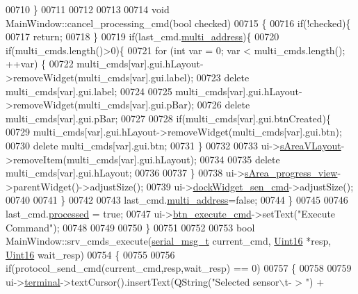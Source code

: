 \begin{DoxyCode}
00710 \}
00711 
00712 
00713 
00714 \textcolor{keywordtype}{void} MainWindow::cancel\_processing\_cmd(\textcolor{keywordtype}{bool} checked)
00715 \{
00716     \textcolor{keywordflow}{if}(!checked)\{
00717         \textcolor{keywordflow}{return};
00718     \}
00719     \textcolor{keywordflow}{if}(last\_cmd.\hyperlink{a00001_a8e69b971c61ced27a7567efd2bf0db59}{multi\_address})\{
00720     \textcolor{keywordflow}{if}(multi\_cmds.length()>0)\{
00721         \textcolor{keywordflow}{for} (\textcolor{keywordtype}{int} var = 0; var < multi\_cmds.length(); ++var) \{
00722             multi\_cmds[var].gui.hLayout->removeWidget(multi\_cmds[var].gui.label);
00723             \textcolor{keyword}{delete} multi\_cmds[var].gui.label;
00724 
00725             multi\_cmds[var].gui.hLayout->removeWidget(multi\_cmds[var].gui.pBar);
00726             \textcolor{keyword}{delete} multi\_cmds[var].gui.pBar;
00727 
00728             \textcolor{keywordflow}{if}(multi\_cmds[var].gui.btnCreated)\{
00729             multi\_cmds[var].gui.hLayout->removeWidget(multi\_cmds[var].gui.btn);
00730             \textcolor{keyword}{delete} multi\_cmds[var].gui.btn;
00731             \}
00732 
00733             ui->\hyperlink{a00027_a2bdce9ad313cd4ee575613f36cbc4678}{sAreaVLayout}->removeItem(multi\_cmds[var].gui.hLayout);
00734 
00735             \textcolor{keyword}{delete} multi\_cmds[var].gui.hLayout;
00736 
00737         \}
00738     ui->\hyperlink{a00027_ae4fe44aa026dd0e84e0f10cdcabca504}{sArea\_progress\_view}->parentWidget()->adjustSize();
00739     ui->\hyperlink{a00027_a9eb86a5ee396766f0f4a65f2d2bd7688}{dockWidget\_sen\_cmd}->adjustSize();
00740 
00741     \}
00742 
00743     last\_cmd.\hyperlink{a00001_a8e69b971c61ced27a7567efd2bf0db59}{multi\_address}=\textcolor{keyword}{false};
00744    \}
00745 
00746     last\_cmd.\hyperlink{a00001_a3e88f779da9798a5da7dda227e2ca388}{processed} = \textcolor{keyword}{true};
00747     ui->\hyperlink{a00027_a9ea50d44e38316e4203933698cbc14a6}{btn\_execute\_cmd}->setText(\textcolor{stringliteral}{"Execute Command"});
00748 
00749 
00750 \}
00751 
00752 
00753 \textcolor{keywordtype}{bool} MainWindow::srv\_cmds\_execute(\hyperlink{a00001_df/dc8/a00122}{serial\_msg\_t} current\_cmd, \hyperlink{a00001_aae7407b021d43f7193a81a58cfb3e297}{Uint16} *resp, 
      \hyperlink{a00001_aae7407b021d43f7193a81a58cfb3e297}{Uint16} wait\_resp)
00754 \{
00755 
00756       \textcolor{keywordflow}{if}(protocol\_send\_cmd(current\_cmd,resp,wait\_resp) == 0)
00757       \{
00758 
00759       ui->\hyperlink{a00027_aae71c46ea4546df5994735dee573b2dd}{terminal}->textCursor().insertText(QString(\textcolor{stringliteral}{"Selected sensor\(\backslash\)t- > "}) +

\end{DoxyCode}
